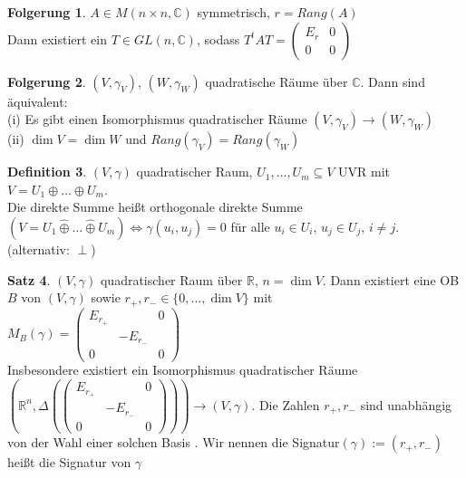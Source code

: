 \documentclass[10pt,a4paper,numbers=endperiod]{scrartcl}
\theoremstyle{definition}
\newtheorem{satz}{Satz}[section]
\newtheorem{defi}[satz]{Definition}
\newtheorem{folg}[satz]{Folgerung}
\def\CC{{\mathbb C}}
\def\RR{{\mathbb R}}
\begin{document}
\begin{folg}
	$A \in M(n \times n, \CC)$ symmetrisch, $r = Rang(A)$\\
	Dann existiert ein $T \in GL(n, \CC)$, sodass $T^tAT = \begin{pmatrix}
	E_r & 0\\
	0 & 0
	\end{pmatrix}$
\end{folg}

\begin{folg}
	$(V, \gamma_V)$, $(W, \gamma_W)$ quadratische Räume über $\CC$. Dann sind äquivalent:\\
	(i) Es gibt einen Isomorphismus quadratischer Räume $(V, \gamma_V) \rightarrow (W, \gamma_W)$\\
	(ii) $\dim V = \dim W$ und $Rang(\gamma_V) = Rang(\gamma_W)$ 
\end{folg}

\begin{defi}
	$(V, \gamma)$ quadratischer Raum, $U_1, \ldots, U_m \subseteq V$ UVR mit $V = U_1 \oplus \ldots \oplus U_m$.\\
	Die direkte Summe heißt orthogonale direkte Summe $(V = U_1 \hat{\oplus} \ldots \hat{\oplus} U_m) \Leftrightarrow \gamma(u_i, u_j) = 0$ für alle $u_i \in U_i$, $u_j \in U_j$, $i \neq j$. (alternativ: $\perp$)
\end{defi}

\begin{satz}
	$(V, \gamma)$ quadratischer Raum über $\RR$, $n = \dim V$. Dann existiert eine OB $B$ von $(V, \gamma)$ sowie $r_+, r_- \in \{0, \ldots, \dim V\}$ mit\\
	$M_B(\gamma) = \begin{pmatrix}
	E_{r_+} & & 0\\
	& -E_{r_-} & \\
	0 & & 0
	\end{pmatrix}$\\
	Insbesondere existiert ein Isomorphismus quadratischer Räume $(\RR^n, \varDelta(\begin{pmatrix}
	E_{r_+} & & 0\\
	& -E_{r_-} & \\
	0 & & 0
	\end{pmatrix})) \rightarrow (V, \gamma)$. Die Zahlen $r_+, r_-$ sind unabhängig von der Wahl einer solchen Basis . Wir nennen die Signatur$(\gamma) := (r_+, r_-)$ heißt die Signatur von $\gamma$ 
\end{satz}
\end{document}

